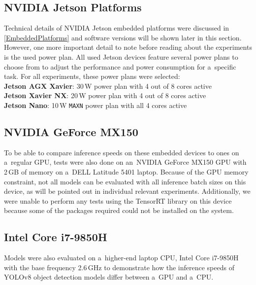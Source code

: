 
\subsection{NVIDIA Jetson Platforms}

Technical details of NVIDIA Jetson embedded platforms were discussed in
\autoref{EmbeddedPlatforms} and software versions will be shown later in this section.
However, one more important detail to note before reading about the experiments
is the used power plan. All used Jetson devices feature several power plans to
choose from to adjust the performance and power consumption for a~specific task.
For all experiments, these power plans were selected: \\
\textbf{Jetson AGX Xavier}: 30\,W power plan with 4 out of 8 cores active \\
\textbf{Jetson Xavier NX}: 20\,W power plan with 4 out of 8 cores active \\
\textbf{Jetson Nano}: 10\,W \texttt{MAXN} power plan with all 4 cores active


\subsection{NVIDIA GeForce MX150}

To be able to compare inference speeds on these embedded devices to ones on
a~regular GPU, tests were also done on an~NVIDIA GeForce MX150 GPU with 2\,GB of
memory on a~DELL Latitude 5401 laptop. Because of the GPU memory constraint, not
all models can be evaluated with all inference batch sizes on this device, as
will be pointed out in individual relevant experiments. Additionally, we were
unable to perform any tests using the TensorRT library on this device because
some of the packages required could not be installed on the system.


\subsection{Intel Core i7-9850H}

Models were also evaluated on a~higher-end laptop CPU, Intel Core i7-9850H with
the base frequency 2.6\,GHz to demonstrate how the inference speeds of YOLOv8
object detection models differ between a~GPU and a~CPU.

